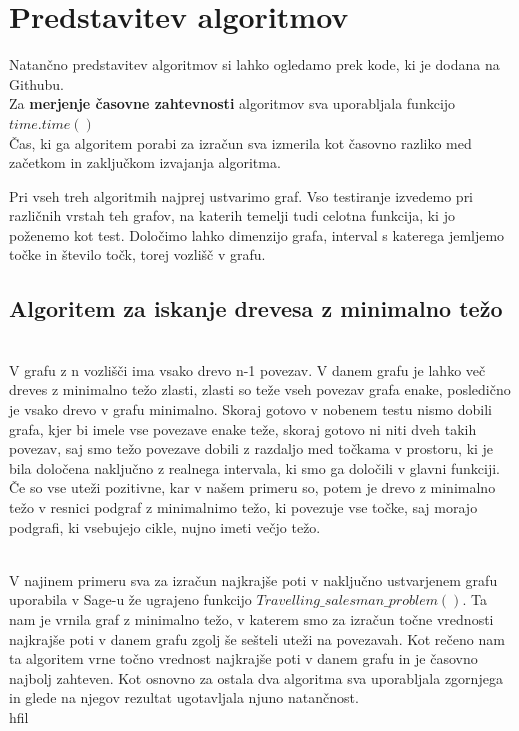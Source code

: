 \documentclass[12pt,a4paper]{amsart}
\theoremstyle{definition} %
\theoremstyle{plain} %
\begin{document}
\newpage
\section {Predstavitev algoritmov} 

Natančno predstavitev algoritmov si lahko ogledamo prek kode, ki je dodana na Githubu. \\
Za \textbf{merjenje časovne zahtevnosti} algoritmov sva uporabljala funkcijo $time.time()$\\
Čas, ki ga algoritem porabi za izračun sva izmerila kot časovno razliko med začetkom in zaključkom izvajanja algoritma.
\bigskip

Pri vseh treh algoritmih najprej ustvarimo graf. Vso testiranje izvedemo pri različnih vrstah teh grafov, na katerih temelji tudi celotna funkcija, ki jo poženemo kot test. 
Določimo lahko dimenzijo grafa, interval s katerega jemljemo točke in število točk, torej vozlišč v grafu.
\bigskip


\subsection{Algoritem za iskanje drevesa z minimalno težo} \hfill\\

V grafu z n vozlišči ima vsako drevo n-1 povezav.
V danem grafu je lahko več dreves z minimalno težo zlasti, zlasti so teže vseh povezav grafa enake, posledično je vsako drevo v grafu minimalno.
Skoraj gotovo v nobenem testu nismo dobili grafa, kjer bi imele vse povezave enake teže, skoraj gotovo ni niti dveh takih povezav, saj smo težo povezave dobili z razdaljo med točkama v prostoru, ki je bila določena naključno z realnega intervala, ki smo ga določili v glavni funkciji.
\newline
Če so vse uteži pozitivne, kar v našem primeru so, potem je drevo z minimalno težo  v resnici podgraf z minimalnimo težo, ki povezuje vse točke, saj morajo podgrafi, ki vsebujejo cikle, nujno imeti večjo težo.
\hfill\\\

V najinem primeru sva za izračun najkrajše poti v naključno ustvarjenem grafu uporabila v Sage-u že ugrajeno funkcijo $Travelling\_salesman\_problem()$.
Ta nam je vrnila graf z minimalno težo, v katerem smo za izračun točne vrednosti najkrajše poti v danem grafu zgolj še sešteli uteži na povezavah.
Kot rečeno nam ta algoritem vrne točno vrednost najkrajše poti v danem grafu in je časovno najbolj zahteven.
Kot osnovno za ostala dva algoritma sva uporabljala zgornjega in glede na njegov rezultat ugotavljala njuno natančnost.
\\hfil\\\
\end{document}
